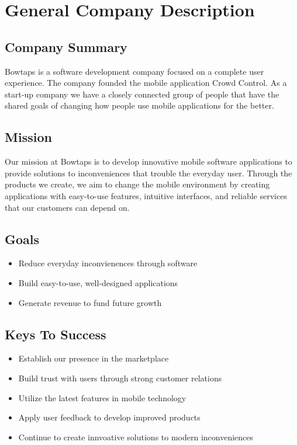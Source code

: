 
\chapter{General Company Description}

\section{Company Summary}

Bowtaps is a software development company focused on a complete user experience. The company founded the mobile application Crowd Control. As a start-up company we have a closely connected group of people that have the shared goals of changing how people use mobile applications for the better.

\section{Mission}

Our mission at Bowtaps is to develop innovative mobile software applications to provide solutions to inconveniences that trouble the everyday user. Through the products we create, we aim to change the mobile environment by creating applications with easy-to-use features, intuitive interfaces, and reliable services that our customers can depend on.

\section{Goals}

	\begin{itemize}
	\item Reduce everyday inconvienences through software
	\item Build easy-to-use, well-designed applications
	\item Generate revenue to fund future growth
	\end{itemize}


\section{Keys To Success}

	\begin{itemize}
	\item Establish our presence in the marketplace
	\item Build trust with users through strong customer relations
	\item Utilize the latest features in mobile technology
	\item Apply user feedback to develop improved products
	\item Continue to create innvoative solutions to modern inconveniences
	\end{itemize}


